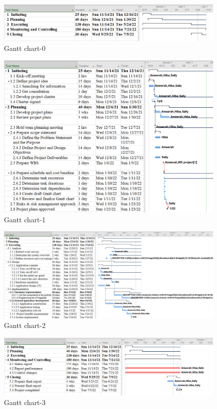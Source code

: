 \documentclass[12pt,a4paper]{report}
\begin{document}
\begin{figure}[H]
    \centering
    \graphicspath{ {./images/} }
    \includegraphics[width=1\textwidth,height=0.12\textheight]{Gantt chart-0.png}
    \caption{Gantt chart-0}
    \label{fig:Gantt-0}
\end{figure}
\begin{figure}[H]
    \centering
    \graphicspath{ {./images/} }
    \includegraphics[width=1\textwidth,height=0.4\textheight]{Gantt chart-1.png}
    \caption{Gantt chart-1}
    \label{fig:Gantt-1}
\end{figure}
\begin{figure}[H]
    \centering
    \graphicspath{ {./images/} }
    \includegraphics[width=1\textwidth,height=0.4\textheight]{Gantt chart-2.png}
    \caption{Gantt chart-2}
    \label{fig:Gantt-2}
\end{figure}
\begin{figure}[H]
    \centering
    \graphicspath{ {./images/} }
    \includegraphics[width=1\textwidth,height=0.4\textheight]{Gantt chart-3.png}
    \caption{Gantt chart-3}
    \label{fig:Gantt-3}
\end{figure}
\end{document}
